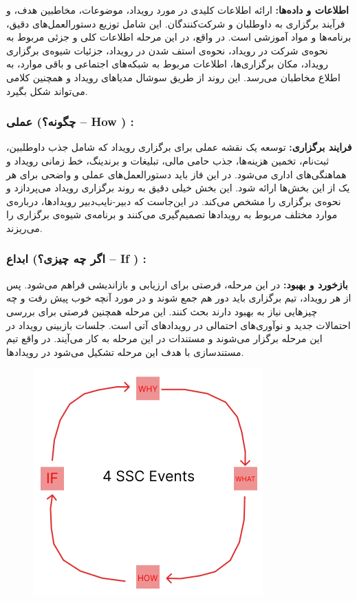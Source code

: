 \textbf{اطلاعات و داده‌ها:}
ارائه اطلاعات کلیدی در مورد رویداد، موضوعات، مخاطبین هدف، و فرآیند برگزاری به داوطلبان و شرکت‌کنندگان. این شامل توزیع دستورالعمل‌های دقیق، برنامه‌ها و مواد آموزشی است. در واقع، در این مرحله اطلاعات کلی و جزئی مربوط به نحوه‌ی شرکت در رویداد، نحوه‌ی استف شدن در رویداد، جزئیات شیوه‌ی برگزاری رویداد، مکان برگزاری‌ها، اطلاعات مربوط به شبکه‌های اجتماعی و باقی موارد، به اطلاع مخاطبان می‌رسد. این روند از طریق سوشال مدیاهای رویداد و همچنین کلامی می‌تواند شکل بگیرد.

\subsubsection*{عملی (چگونه؟ – How ) :}

\textbf{فرایند برگزاری:}
توسعه یک نقشه عملی برای برگزاری رویداد که شامل جذب داوطلبین، ثبت‌نام، تخمین هزینه‌ها، جذب حامی مالی، تبلیغات و برندینگ، خط زمانی رویداد و هماهنگی‌های اداری می‌شود. در این فاز باید دستورالعمل‌های عملی و واضحی برای هر یک از این بخش‌ها ارائه شود. این بخش خیلی دقیق به روند برگزاری رویداد می‌پردازد و نحوه‌ی برگزاری را مشخص می‌کند. در این‌جاست که دبیر-نایب‌دبیر رویدادها، درباره‌ی موارد مختلف مربوط به رویدادها تصمیم‌گیری می‌کنند و برنامه‌ی شیوه‌ی برگزاری را می‌ریزند. 

\subsubsection*{ابداع (اگر چه چیزی؟ – If ) :}

\textbf{بازخورد و بهبود:}
در این مرحله، فرصتی برای ارزیابی و بازاندیشی فراهم می‌شود. پس از هر رویداد، تیم برگزاری باید دور هم جمع شوند و در مورد آنچه خوب پیش رفت و چه چیزهایی نیاز به بهبود دارند بحث کنند. این مرحله همچنین فرصتی برای بررسی احتمالات جدید و نوآوری‌های احتمالی در رویدادهای آتی است. جلسات بازبینی رویداد در این مرحله برگزار می‌شوند و مستندات در این مرحله به کار می‌آیند. در واقع تیم مستندسازی با هدف این مرحله تشکیل می‌شود در رویدادها.

\begin{figure}[h]
	\centering
	\includegraphics{pic1.png}
	\label{fig:label4}
\end{figure}

